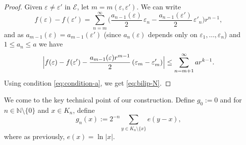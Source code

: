 \documentclass[10pt]{amsart}
\let\backslash\setminus
\let\sm\setminus
\numberwithin{equation}{section}
\theoremstyle{plain}
\theoremstyle{definition}
\newcommand{\cE}{{\mathcal E}}
\begin{document}
\begin{proof}
Given $\varepsilon \neq \varepsilon'$ in $\cE$, let $m=m(\varepsilon,\varepsilon')$. We can write
\[
f(\varepsilon)-f(\varepsilon') = \sum_{n=m}^\infty \Big (\dfrac{a_{n-1}(\varepsilon)}{2}\, \varepsilon_n - \dfrac{a_{n-1}(\varepsilon')}{2}\, \varepsilon'_n \Big) r^{n-1},
\]
and as $a_{m-1} (\varepsilon)= a_{m-1}( \varepsilon')$ (since $a_n(\varepsilon)$ depends only on
$\varepsilon_1, \dotsc, \varepsilon_n$) and $1\le a_n \le a$ we have
\[
\Bigl |f(\varepsilon)-f(\varepsilon') - \dfrac{a_{m-1}(\varepsilon)r^{m-1}}{2}\, (\varepsilon_m -\varepsilon'_m)\Bigr| \le \sum_{n=m+1}^\infty a r^{k-1}.
\]
Using condition \eqref{eq:condition-a}, we get \eqref{eq:bilip-N}.
\end{proof}

We come to the key technical point of our construction.
Define $g_0 :=0$ and for $n \in \mathbb{N}\sm\{0\}$ and $x\in K_n$, define
\begin{equation}\label{eq:defg}
g_n(x):= 2^{-n} \sum_{y\in K_n\backslash \{x\}} e(y-x),
\end{equation}
where as previously, $e(x) = \ln |x|$.
\end{document}
